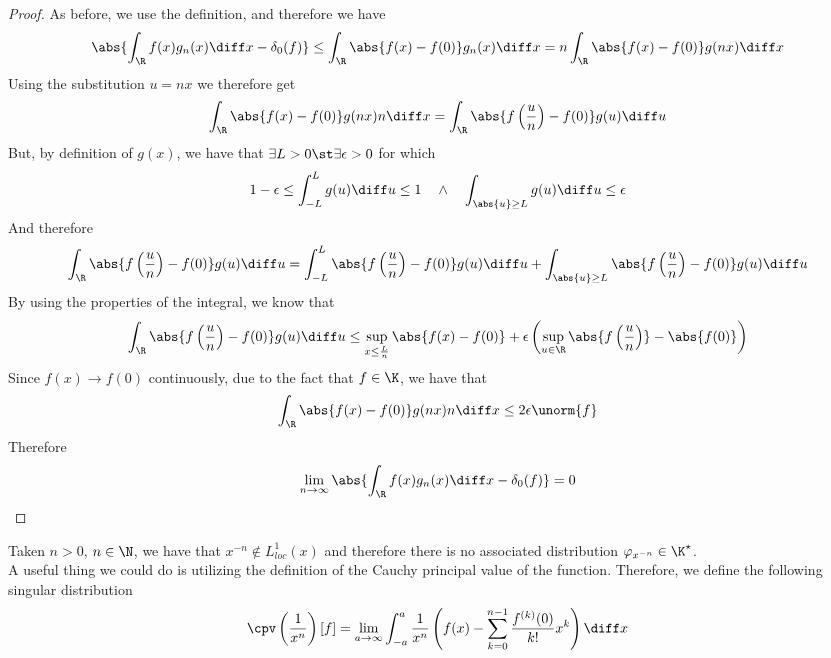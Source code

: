 \documentclass[../mmf.tex]{subfiles}
\begin{document}
\begin{proof}
	As before, we use the definition, and therefore we have
	\begin{equation*}
		\abs{\int_{\R}^{}f(x)g_n(x)\diff x-\delta_0(f)}\le\int_{\R}^{}\abs{f(x)-f(0)}g_n(x)\diff x=n\int_{\R}^{}\abs{f(x)-f(0)}g(nx)\diff x
	\end{equation*}
	Using the substitution $u=nx$ we therefore get
	\begin{equation*}
		\int_{\R}^{}\abs{f(x)-f(0)}g(nx)n\diff x=\int_{\R}^{}\abs{f\left( \frac{u}{n} \right)-f(0)}g(u)\diff u
	\end{equation*}
	But, by definition of $g(x)$, we have that $\exists L>0\st\exists\epsilon>0$ for which
	\begin{equation*}
		1-\epsilon\le\int_{-L}^{L}g(u)\diff u\le1\quad\wedge\quad\int_{\abs{u}\ge L}^{}g(u)\diff u\le\epsilon
	\end{equation*}
	And therefore
	\begin{equation*}
		\int_{\R}^{}\abs{f\left( \frac{u}{n} \right)-f(0)}g(u)\diff u=\int_{-L}^{L}\abs{f\left( \frac{u}{n} \right)-f(0)}g(u)\diff u+\int_{\abs{u}\ge L}^{}\abs{f\left( \frac{u}{n} \right)-f(0)}g(u)\diff u
	\end{equation*}
	By using the properties of the integral, we know that
	\begin{equation*}
		\int_{\R}^{}\abs{f\left( \frac{u}{n} \right)-f(0)}g(u)\diff u\le\sup_{x\le\frac{L}{n}}\abs{f(x)-f(0)}+\epsilon\left( \sup_{u\in\R}\abs{f\left( \frac{u}{n} \right)}-\abs{f(0)} \right)
	\end{equation*}
	Since $f(x)\to f(0)$ continuously, due to the fact that $f\in\K$, we have that
	\begin{equation*}
		\int_{\R}^{}\abs{f(x)-f(0)}g(nx)n\diff x\le2\epsilon\unorm{f}
	\end{equation*}
	Therefore
	\begin{equation*}
		\lim_{n\to\infty}\abs{\int_{\R}^{}f(x)g_n(x)\diff x-\delta_0(f)}=0
	\end{equation*}
\end{proof}
\begin{dfn}
	Taken $n>0$, $n\in\N$, we have that $x^{-n}\notin L^1_{loc}(x)$ and therefore there is no associated distribution $\varphi_{x^{-n}}\in\K^\star$.\\
	A useful thing we could do is utilizing the definition of the Cauchy principal value of the function. Therefore, we define the following singular distribution
	\begin{equation}
		\cpv\left( \frac{1}{x^n} \right)[f]=\lim_{a\to\infty}\int_{-a}^{a}\frac{1}{x^n}\left( f(x)-\sum_{k=0}^{n-1}\frac{f^{(k)}(0)}{k!}x^k \right)\diff x
		\label{eq:cpvdist}
	\end{equation}
\end{dfn}
\end{document}
